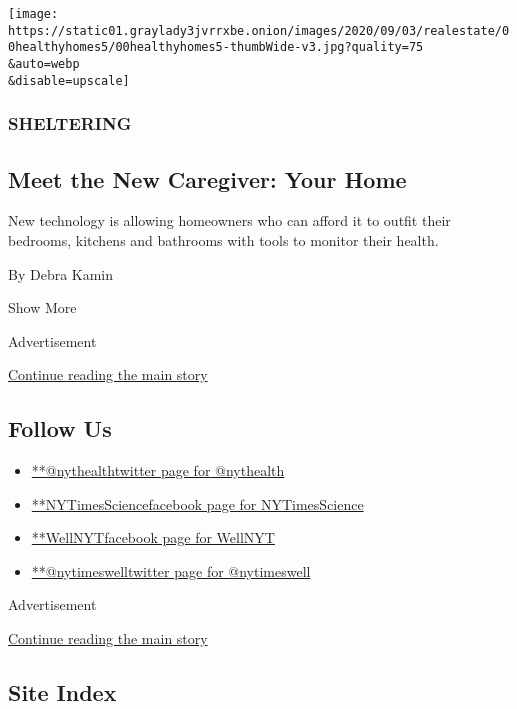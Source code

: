 \begin{enumerate}
  \texttt{[image: https://static01.graylady3jvrrxbe.onion/images/2020/09/03/realestate/00healthyhomes5/00healthyhomes5-thumbWide-v3.jpg?quality=75\\\&auto=webp\\\&disable=upscale]}

  \hypertarget{sheltering}{%
  \subsubsection{SHELTERING}\label{sheltering}}

  \hypertarget{meet-the-new-caregiver-your-home}{%
  \subsection{Meet the New Caregiver: Your
  Home}\label{meet-the-new-caregiver-your-home}}

  New technology is allowing homeowners who can afford it to outfit
  their bedrooms, kitchens and bathrooms with tools to monitor their
  health.

  By Debra Kamin
\end{enumerate}

Show More

Advertisement

\protect\hyperlink{after-mid3}{Continue reading the main story}

\hypertarget{follow-us}{%
\subsection{Follow Us}\label{follow-us}}

\begin{itemize}
\tightlist
\item
  \href{https://twitter.com/nythealth}{**@nythealthtwitter page for
  @nythealth}
\item
  \href{https://www.facebookcorewwwi.onion/NYTimesScience}{**NYTimesSciencefacebook
  page for NYTimesScience}
\item
  \href{https://www.facebookcorewwwi.onion/WellNYT}{**WellNYTfacebook
  page for WellNYT}
\item
  \href{https://twitter.com/nytimeswell}{**@nytimeswelltwitter page for
  @nytimeswell}
\end{itemize}

Advertisement

\protect\hyperlink{after-mktg}{Continue reading the main story}

\hypertarget{site-index}{%
\subsection{Site Index}\label{site-index}}

